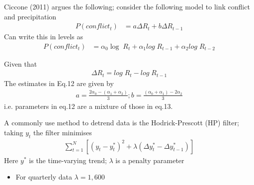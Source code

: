 \documentclass{beamer}
\begin{document}
\begin{frame}
  Ciccone (2011) argues the following; consider the following model to link conflict and precipitation   
  \begin{align}
    P(conflict_t) &= a \Delta R_t + b \Delta R_{t-1}  
  \end{align}
  \medskip
  Can write this in levels as
  \begin{align}
    P(conflict_t) &= \alpha_0\log\; R_t + \alpha_1 log\; R_{t-1} + \alpha_2 log\; R_{t-2}  
  \end{align}    
\end{frame}

\begin{frame}
Given that 
  \begin{align}
    \Delta R_t = log\;R_t - log\; R_{t-1}
  \end{align}
  \medskip 
  The estimates in Eq.12 are given by
  \begin{align}
    a=\frac{2\alpha_0-(\alpha_1+\alpha_2)}{3}; b=\frac{(\alpha_0 + \alpha_1)-2\alpha_2}{3}
  \end{align}
  \medskip
  i.e. parameters in eq.12 are a mixture of those in eq.13.
\end{frame}

\begin{frame}
 A commonly use method to detrend data is the Hodrick-Prescott (HP) filter; taking $y_t$ the filter minimises
\begin{align}
 \sum_{t=1}^{N} [(y_t - y_t^*)^2+ \lambda(\Delta y_t^* - \Delta y_{t-1}^*)]
\end{align}
\medskip
Here $y^*$ is the time-varying trend; $\lambda$ is a penalty parameter
\begin{itemize}
  \item For quarterly data $\lambda=1,600$
\end{itemize}
\end{frame}
\end{document}
